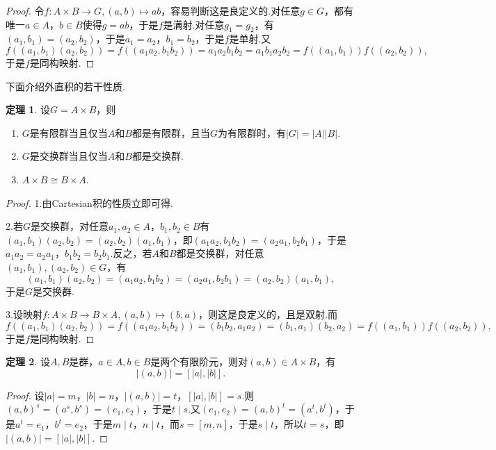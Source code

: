 \documentclass[12pt]{ctexart}
\theoremstyle{definition}
\newtheorem{theorem}{定理}
\theoremstyle{plain}
\begin{document}
	\begin{proof}
		令$f:A\times B\to G,(a,b)\mapsto ab$，容易判断这是良定义的.对任意$g\in G$，都有唯一$a\in A$，$b\in B$使得$g=ab$，于是$f$是满射.对任意$g_1=g_2$，有$(a_1,b_1)=(a_2,b_2)$，于是$a_1=a_2$，$b_1=b_2$，于是$f$是单射.又
		$$f\left((a_1,b_1)(a_2,b_2)\right)=f\left((a_1a_2,b_1b_2)\right)=a_1a_2b_1b_2=a_1b_1a_2b_2=f\left((a_1,b_1)\right)f\left((a_2,b_2)\right),$$
		于是$f$是同构映射.
	\end{proof}
	下面介绍外直积的若干性质.
	\begin{theorem}
		设$G=A\times B$，则
		\begin{enumerate}
			\item $G$是有限群当且仅当$A$和$B$都是有限群，且当$G$为有限群时，有$|G|=|A||B|$.
			\item $G$是交换群当且仅当$A$和$B$都是交换群.
			\item $A\times B\cong B\times A$.
		\end{enumerate}
	\end{theorem}
	\begin{proof}
		1.由Cartesian积的性质立即可得.
		
		2.若$G$是交换群，对任意$a_1,a_2\in A$，$b_1,b_2\in B$有$(a_1,b_1)(a_2,b_2)=(a_2,b_2)(a_1,b_1)$，即$(a_1a_2,b_1b_2)=(a_2a_1,b_2b_1)$，于是$a_1a_2=a_2a_1$，$b_1b_2=b_2b_1$.反之，若$A$和$B$都是交换群，对任意$(a_1,b_1),(a_2,b_2)\in G$，有
		$$(a_1,b_1)(a_2,b_2)=(a_1a_2,b_1b_2)=(a_2a_1,b_2b_1)=(a_2,b_2)(a_1,b_1),$$
		于是$G$是交换群.
		
		3.设映射$f:A\times B\to B\times A,(a,b)\mapsto(b,a)$，则这是良定义的，且是双射.而
		$$f\left((a_1,b_1)(a_2,b_2)\right)=f\left((a_1a_2,b_1b_2)\right)=(b_1b_2,a_1a_2)=(b_1,a_1)(b_2,a_2)=f\left((a_1,b_1)\right)f\left((a_2,b_2)\right),$$
		于是$f$是同构映射.
	\end{proof}
	\begin{theorem}
		设$A,B$是群，$a\in A,b\in B$是两个有限阶元，则对$(a,b)\in A\times B$，有
		$$|(a,b)|=\left[|a|,|b|\right].$$
	\end{theorem}
	\begin{proof}
		设$|a|=m$，$|b|=n$，$|(a,b)|=t$，$\left[|a|,|b|\right]=s$.则$(a,b)^s=(a^s,b^s)=(e_1,e_2)$，于是$t\mid s$.又$(e_1,e_2)=(a,b)^t=(a^t,b^t)$，于是$a^t=e_1$，$b^t=e_2$，于是$m\mid t$，$n\mid t$，而$s=\left[m,n\right]$，于是$s\mid t$，所以$t=s$，即$|(a,b)|=\left[|a|,|b|\right]$.
	\end{proof}
\end{document}
